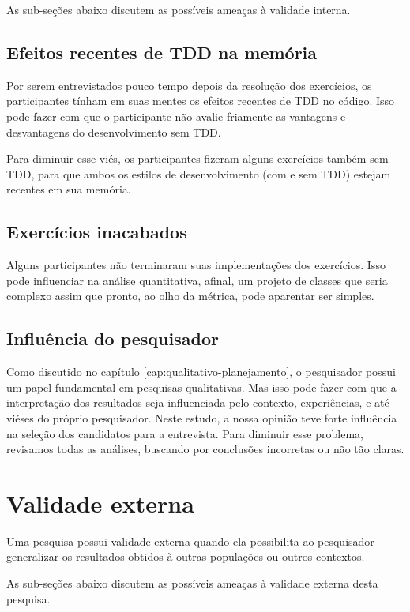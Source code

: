 As sub-seções abaixo discutem as possíveis ameaças à validade interna.

\subsection{Efeitos recentes de TDD na memória}

Por serem entrevistados pouco tempo depois da resolução dos exercícios, os participantes tínham
em suas mentes os efeitos recentes de TDD no código. Isso pode fazer com que o participante
não avalie friamente as vantagens e desvantagens do desenvolvimento sem TDD. 

Para diminuir esse viés, os participantes fizeram alguns exercícios também
sem TDD, para que ambos os estilos de desenvolvimento (com e sem TDD) estejam
recentes em sua memória.

\subsection{Exercícios inacabados}

Alguns participantes não terminaram suas implementações dos exercícios. Isso
pode influenciar na análise quantitativa, afinal, um projeto de classes que
seria complexo assim que pronto, ao olho da métrica, pode aparentar ser simples.

\subsection{Influência do pesquisador}

Como discutido no capítulo \ref{cap:qualitativo-planejamento}, o pesquisador possui
um papel fundamental em pesquisas qualitativas. Mas isso pode fazer com que
a interpretação dos resultados seja influenciada pelo contexto, experiências,
e até viéses do próprio pesquisador.
Neste estudo, a nossa opinião teve forte influência na seleção dos candidatos
para a entrevista.
Para diminuir esse problema, revisamos todas as análises,
buscando por conclusões incorretas ou não tão claras. 

\section{Validade externa}

Uma pesquisa possui validade externa quando ela possibilita ao pesquisador 
generalizar os resultados obtidos à outras populações ou outros contextos.

As sub-seções abaixo discutem as possíveis ameaças à validade externa
desta pesquisa.

